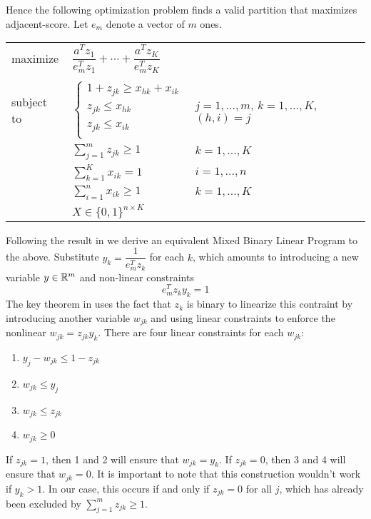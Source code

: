 Hence the following optimization problem finds a valid partition that
maximizes adjacent-score. Let $e_m$ denote a vector of $m$ ones.

\bgroup
\def\arraystretch{1.5}
\begin{tabular}{l l l}
maximize   & $\dfrac{a^T z_1}{e_m^T z_1} + \cdots +
              \dfrac{a^T z_K}{e_m^T z_K}$
\\ \\
subject to 
           & $\begin{cases}
                 1 + z_{jk} \geq x_{hk} + x_{ik} \\
                 z_{jk} \leq x_{hk}             \\
                 z_{jk} \leq x_{ik}             \\
             \end{cases}$
           & $j = 1, ..., m$, $k = 1, ..., K$, $(h,i) = j$ \\
           & $\sum_{j=1}^m z_{jk} \geq 1$ & $k = 1, ..., K$ \\
           & $\sum_{k=1}^K x_{ik} = 1$ & $i = 1, ..., n$ \\
           & $\sum_{i=1}^n x_{ik} \geq 1$ & $k = 1, ..., K$ \\
           & $X \in \{0, 1\}^{n \times K}$
\end{tabular}
\egroup

Following the result in \cite{Li:94} we derive an equivalent Mixed Binary
Linear Program to the above.
Substitute $y_k = \dfrac{1}{e_m^T z_k}$ for each $k$, which amounts to
introducing a new variable $y \in \mathbb{R}^m$ and non-linear constraints
\[ e_m^T z_k y_k = 1 \]
The key theorem in \cite{Li:94} uses the fact that $z_k$ is binary to
linearize this contraint by introducing another variable $w_{jk}$ and
using linear constraints to enforce the nonlinear $w_{jk} = z_{jk} y_k$.
There are four linear constraints for each $w_{jk}$:

\begin{enumerate}
\item
$y_j - w_{jk} \leq 1 - z_{jk} $
\item
$w_{jk} \leq y_j$
\item
$w_{jk} \leq z_{jk}$
\item
$w_{jk} \geq 0$ 
\end{enumerate}

If $z_{jk} = 1$, then 1 and 2 will ensure that $w_{jk} = y_k$.
If $z_{jk} = 0$, then 3 and 4 will ensure that $w_{jk} = 0$.
It is important to note that this construction wouldn't work if
$y_k > 1$. In our case, this occurs if and only if $z_{jk} = 0$ for all
$j$, which has already been excluded by $\sum_{j=1}^m z_{jk} \geq 1$.

